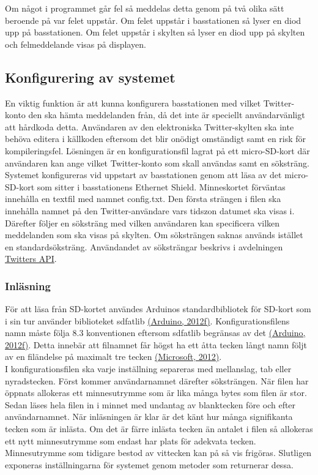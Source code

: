 \documentclass[a4paper,11pt]{article}
\begin{document}
Om något i programmet går fel så meddelas detta genom på två olika sätt beroende på var felet uppstår. Om felet uppstår i basstationen så lyser en diod upp på basstationen. Om felet uppstår i skylten så lyser en diod upp på skylten och felmeddelande visas på displayen.

\subsection{Konfigurering av systemet}
En viktig funktion är att kunna konfigurera basstationen med vilket Twitter-konto den ska hämta meddelanden från, då det inte är speciellt användarvänligt att hårdkoda detta. Användaren av den elektroniska Twitter-skylten ska inte behöva editera i källkoden eftersom det blir onödigt omständigt samt en risk för kompileringsfel. Lösningen är en konfigurationsfil lagrat på ett micro-SD-kort där användaren kan ange vilket Twitter-konto som skall användas samt en söksträng.\\

Systemet konfigureras vid uppstart av basstationen genom att läsa av det micro-SD-kort som sitter i basstationens Ethernet Shield. Minneskortet förväntas innehålla en textfil med namnet config.txt. Den första strängen i filen ska innehålla namnet på den Twitter-användare vars tidszon datumet ska visas i. Därefter följer en söksträng med vilken användaren kan specificera vilken meddelanden som ska visas på skylten. Om söksträngen saknas används istället en standardsöksträng. Användandet av söksträngar beskrivs i avdelningen \hyperref[twitterapi]{Twitters API}.


\subsubsection{Inläsning}
För att läsa från SD-kortet användes Arduinos standardbibliotek för SD-kort som i sin tur använder biblioteket sdfatlib \hyperref[arduino]{(Arduino, 2012f)}. Konfigurationsfilens namn måste följa 8.3 konventionen eftersom sdfatlib begränsas av det \hyperref[arduino]{(Arduino, 2012f)}. Detta innebär att filnamnet får högst ha ett åtta tecken långt namn följt av en filändelse på maximalt tre tecken \hyperref[microsoft]{(Microsoft, 2012)}.\\

I konfigurationsfilen ska varje inställning separeras med mellanslag, tab eller nyradstecken. Först kommer användarnamnet därefter söksträngen. När filen har öppnats allokeras ett minnesutrymme som är lika många bytes som filen är stor. Sedan läses hela filen in i minnet med undantag av blanktecken före och efter användarnamnet. När inläsningen är klar är det känt hur många signifikanta tecken som är inlästa. Om det är färre inlästa tecken än antalet i filen så allokeras ett nytt minnesutrymme som endast har plats för adekvata tecken. Minnesutrymme som tidigare bestod av vittecken kan på så vis frigöras. Slutligen exponeras inställningarna för systemet genom metoder som returnerar dessa.
\end{document}
